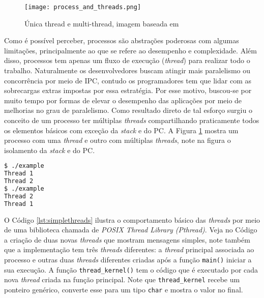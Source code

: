 \begin{figure}[!h]
  \centering
  \texttt{[image: process\_and\_threads.png]}
  \caption{Única thread e multi-thread, imagem baseada em \cite{silberschatz}}
  \label{fig:single_thread_multi_thread}
\end{figure}

Como é possível perceber, processos são abstrações poderosas com algumas
limitações, principalmente ao que se refere ao desempenho e complexidade. Além
disso, processos tem apenas um fluxo de execução (\textit{thread}) para
realizar todo o trabalho. Naturalmente os desenvolvedores buscam atingir mais
paralelismo ou concorrência por meio de IPC, contudo os programadores tem que
lidar com as sobrecargas extras impostas por essa estratégia. Por esse motivo,
buscou-se por muito tempo por formas de elevar o desempenho das aplicações por
meio de melhorias no grau de paralelismo. Como resultado direto de tal esforço
surgiu o conceito de um processo ter múltiplas \emph{threads} compartilhando
praticamente todos os elementos básicos com exceção da \emph{stack} e do PC. A
Figura \ref{fig:single_thread_multi_thread} mostra um processo com uma
\emph{thread} e outro com múltiplas \emph{threads}, note na figura o isolamento
da \emph{stack} e do PC.



\begin{lstlisting}[frame=single,
                   language=bash,
                   caption={Saída do exemplo de threads},
                   label={lst:simpleThreadOutput}]
$ ./example 
Thread 1 
Thread 2
$ ./example
Thread 2 
Thread 1
\end{lstlisting}

O Código \ref{lst:simplethreads} ilustra o comportamento básico das
\emph{threads} por meio de uma biblioteca chamada de \emph{POSIX Thread Library
(Pthread)}. Veja no Código a criação de duas novas \emph{threads} que mostram
mensagens simples, note também que a implementação tem três \emph{threads}
diferentes: a \emph{thread} principal associada ao processo e outras duas
\emph{threads} diferentes criadas após a função \texttt{main()} iniciar a sua
execução. A função \texttt{thread\_kernel()} tem o código que é executado por
cada nova \emph{thread} criada na função principal. Note que
\texttt{thread\_kernel} recebe um ponteiro genérico, converte esse para um tipo
\texttt{char} e mostra o valor no final.

